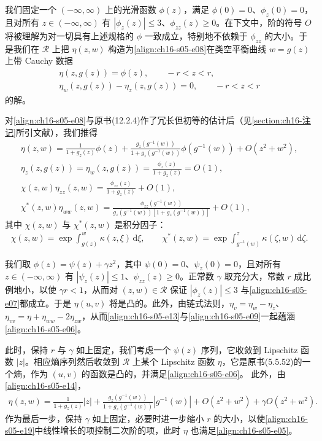 \documentclass[../../main.tex]{subfiles}
\begin{document}
我们固定一个 $(-\infty,\infty)$ 上的光滑函数 $\phi(z)$，满足 $\phi(0)=0$、$\phi_z(0)=0$，且对所有 $z\in(-\infty,\infty)$ 有 $|\phi_z(z)|\leqslant3$、$\phi_{zz}(z)\geqslant0$。在下文中，阶的符号 $O$ 将被理解为对一切具有上述规格的 $\phi$ 一致成立，特别地不依赖于 $\phi_{zz}$ 的大小。于是我们在 $\mathscr{R}$ 上把 $\eta(z,w)$ 构造为\eqref{align:ch16-s05-e08}在类空平衡曲线 $w=g(z)$ 上带 Cauchy 数据
\begin{align}
\eta(z,g(z))=\phi(z),\qquad-r<z<r,
\label{align:ch16-s05-e12}\\
\eta_w(z,g(z))-\eta_z(z,g(z))=0,\qquad-r<z<r
\label{align:ch16-s05-e13}
\end{align}
的解。

对\eqref{align:ch16-s05-e08}与原书(12.2.4)作了冗长但初等的估计后（见\cref{section:ch16-注记}所引文献），我们推得
\begin{align}
\eta(z,w)=\frac{1}{1+g_z(z)}\phi(z)+\frac{g_z(g^{-1}(w))}{1+g_z(g^{-1}(w))}\phi(g^{-1}(w))+O(z^2+w^2),
\label{align:ch16-s05-e14}\\
\eta_z(z,g(z))=\eta_w(z,g(z))=\frac{\phi_z(z)}{1+g_z(z)}=O(1),
\label{align:ch16-s05-e15}\\
\chi(z,w)\eta_{zz}(z,w)=\frac{\phi_{zz}(z)}{1+g_z(z)}+O(1),
\label{align:ch16-s05-e16}\\
\chi^*(z,w)\eta_{ww}(z,w)=\frac{\phi_{zz}(g^{-1}(w))}{g_z(g^{-1}(w))[1+g_z(g^{-1}(w))]}+O(1),
\label{align:ch16-s05-e17}
\end{align}
其中 $\chi(z,w)$ 与 $\chi^*(z,w)$ 是积分因子：
\begin{align}
\chi(z,w)=\exp\int_{g(z)}^w\kappa(z,\xi)\,\mathrm{d}\xi,\qquad\chi^*(z,w)=\exp\int_{g^{-1}(w)}^z\kappa(\zeta,w)\,\mathrm{d}\zeta.
\label{align:ch16-s05-e18}
\end{align}

我们取 $\phi(z)=\psi(z)+\gamma z^2$，其中 $\psi(0)=0$、$\psi_z(0)=0$，且对所有 $z\in(-\infty,\infty)$ 有 $|\psi_z(z)|\leqslant1$、$\psi_{zz}(z)\geqslant0$。正常数 $\gamma$ 取充分大，常数 $r$ 成比例地小，以使 $\gamma r<1$，从而对 $(z,w)\in\mathscr{R}$ 保证 $|\phi_z(z)|\leqslant3$ 与\eqref{align:ch16-s05-e07}都成立。于是 $\eta(u,v)$ 将是凸的。此外，由链式法则，$\eta_v=\eta_w-\eta_z$、$\eta_{vv}=\eta+\eta_{ww}-2\eta_{zw}$，从而\eqref{align:ch16-s05-e13}与\eqref{align:ch16-s05-e09}一起蕴涵\eqref{align:ch16-s05-e06}。

此时，保持 $r$ 与 $\gamma$ 如上固定，我们考虑一个 $\psi(z)$ 序列，它收敛到 Lipschitz 函数 $|z|$。相应熵序列然后收敛到 $\mathscr{R}$ 上某个 Lipschitz 函数 $\eta$，它是原书(5.5.52)的一个熵，作为 $(u,v)$ 的函数是凸的，并满足\eqref{align:ch16-s05-e06}。
此外，由\eqref{align:ch16-s05-e14}，
\begin{align}
\eta(z,w)=\frac{1}{1+g_z(z)}|z|+\frac{g_z(g^{-1}(w))}{1+g_z(g^{-1}(w))}|g^{-1}(w)|+O(z^2+w^2)+\gamma O(z^2+w^2).
\label{align:ch16-s05-e19}
\end{align}
作为最后一步，保持 $\gamma$ 如上固定，必要时进一步缩小 $r$ 的大小，以使\eqref{align:ch16-s05-e19}中线性增长的项控制二次阶的项，此时 $\eta$ 也满足\eqref{align:ch16-s05-e05}。
\end{document}
